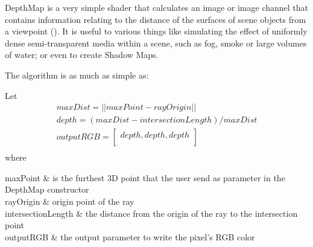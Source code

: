 \par
DepthMap is a very simple shader that calculates an image or image channel that contains information relating to the distance of the surfaces of scene objects from a viewpoint (\cite{DepthMap}).
It is useful to various things like simulating the effect of uniformly dense semi-transparent media within a scene, such as fog, smoke or large volumes of water; or even to create Shadow Maps.

The algorithm is as much as simple as:




Let
\begin{equation}
\label{DepthMapAlgorithm}
\begin{aligned}
maxDist = ||maxPoint - rayOrigin|| \\
depth = (maxDist - intersectionLength) / maxDist \\
outputRGB = \begin{bmatrix}
depth, depth, depth\\
\end{bmatrix} \\
\end{aligned}
\end{equation}
where
\begin{conditions*}
	maxPoint & is the furthest 3D point that the user send as parameter in the DepthMap constructor \\
	rayOrigin & origin point of the ray \\
	intersectionLength & the distance from the origin of the ray to the intersection point  \\
	outputRGB & the output parameter to write the pixel's RGB color \\
\end{conditions*}

